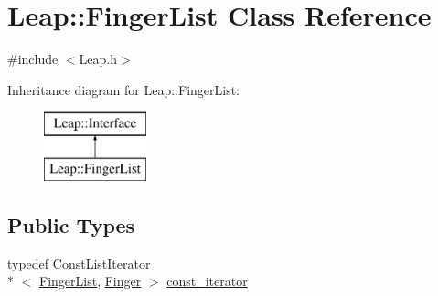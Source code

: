 \hypertarget{class_leap_1_1_finger_list}{\section{Leap\+:\+:Finger\+List Class Reference}
\label{class_leap_1_1_finger_list}
}


{\ttfamily \#include $<$Leap.\+h$>$}

Inheritance diagram for Leap\+:\+:Finger\+List\+:\begin{figure}[H]
\begin{center}
\leavevmode
\includegraphics[height=2.000000cm]{class_leap_1_1_finger_list}
\end{center}
\end{figure}
\subsection*{Public Types}
\begin{DoxyCompactItemize}
\item 
typedef \hyperlink{class_leap_1_1_const_list_iterator}{Const\+List\+Iterator}\\*
$<$ \hyperlink{class_leap_1_1_finger_list}{Finger\+List}, \hyperlink{class_leap_1_1_finger}{Finger} $>$ \hyperlink{class_leap_1_1_finger_list_a9ecff6e555096064a09bb66a8cb5e567}{const\+\_\+iterator}
\end{DoxyCompactItemize}
